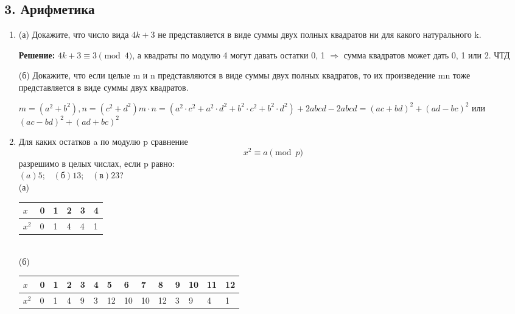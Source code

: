 \documentclass[]{book}
\theoremstyle{definition}
\begin{document}
\subsection*{3. Арифметика}

\begin{enumerate}[resume]

\item (а) Докажите, что число вида $4k+3$  не представляется в виде суммы двух полных квадратов ни для какого натурального k.

\textbf{Решение:}
$4k+3 \equiv 3 \pmod{4}$, а квадраты по модулю 4 могут давать остатки 0, 1 $\Rightarrow$ сумма квадратов может дать 0, 1 или 2. ЧТД



(б) Докажите, что если целые m и n представляются в виде суммы двух полных квадратов, то их произведение mn тоже представляется в виде суммы двух квадратов.


$m=(a^2 + b^2), n=(c^2 + d^2) m\cdot{n}=(a^2\cdot{c^2} + a^2\cdot{d^2}+b^2\cdot{c^2}+b^2\cdot{d^2})+2abcd - 2abcd = (ac+bd)^2 + (ad-bc)^2$ или $(ac-bd)^2 + (ad+bc)^2$



\item Для каких остатков a по модулю p сравнение 
$$x^2 \equiv a \pmod{p}$$
разрешимо в целых числах, если p равно:\\
$(a)5$;\ \ $(\text{б})13$;\ \ $(\text{в})23$?\\
(а)
\begin{minipage}{0.3\textwidth}

\begin{tabular}{ | l || l | l | l | l | l | }
\hline
$x$ & 0 & 1 & 2 & 3 & 4\\ \hline
$x^2$ & 0 & 1 & 4 & 4 & 1       \\  \hline

\hline
\end{tabular}
\end{minipage}
\\
(б)
\begin{minipage}{0.3\textwidth}

\begin{tabular}{ | l || l | l | l | l | l | l | l | l | l | l | l | l | l | }
\hline
$x$ & 0 & 1 & 2 & 3 & 4 & 5 & 6 & 7 & 8 & 9 & 10 & 11 & 12\\ \hline
$x^2$ & 0 & 1 & 4 & 9 & 3 & 12 & 10 & 10 & 12 & 3 & 9 & 4 & 1       \\  \hline


\end{tabular}
\end{minipage}
\end{enumerate}
\end{document}
